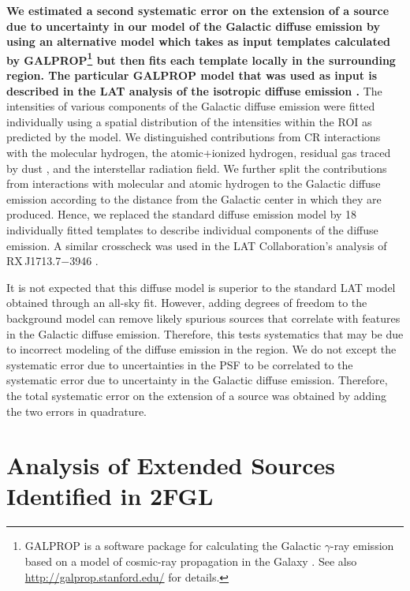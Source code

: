 \documentclass[12pt,preprint]{aastex}
\newcommand{\newtext}[1]{{\bfseries \color{red}#1}}
\begin{document}

\newtext{
We estimated a second systematic error on the extension of a source
due to uncertainty in our model of the Galactic diffuse emission by
using an alternative model which takes as input templates
calculated by
GALPROP\footnote{GALPROP is a software package for calculating the
Galactic $\gamma$-ray emission based on a model of cosmic-ray propagation
in the Galaxy \citep{galprop1998,galprop2011}. 
See also \url{http://galprop.stanford.edu/} for details.} 
but then fits each template locally in
the surrounding region.
The particular GALPROP model that was used as input is described in
the LAT analysis of the isotropic diffuse
emission \citep{isotropic_lat}.  
}
The intensities of various components
of the Galactic diffuse emission were fitted individually using a
spatial distribution of the intensities within the ROI as predicted by
the model.  We distinguished contributions from CR interactions with the
molecular hydrogen, the atomic+ionized hydrogen, residual gas traced
by dust \citep{isabelle_dark_gass}, and the interstellar radiation
field. We further split the contributions from interactions with molecular
and atomic hydrogen to the Galactic diffuse emission according to the
distance from the Galactic center in which they are produced. Hence, we
replaced the standard diffuse emission model by 18 individually fitted
templates to describe individual components of the diffuse emission.
A similar crosscheck was used in the LAT Collaboration's analysis of 
RX\,J1713.7$-$3946 \citep{rx_j1713_lat}.

It is not expected that this diffuse model is superior to the standard
LAT model obtained through an all-sky fit.  However, adding degrees of
freedom to the background model can remove likely spurious sources that
correlate with features in the Galactic diffuse emission.  Therefore,
this tests systematics that may be due to incorrect modeling of the
diffuse emission in the region.  We do not except the systematic error
due to uncertainties in the PSF to be correlated to the systematic
error due to uncertainty in the Galactic diffuse emission. Therefore,
the total systematic error on the extension of a source was obtained by
adding the two errors in quadrature.

\section{Analysis of Extended Sources Identified in 2FGL}
\label{validate_known}
\end{document}
